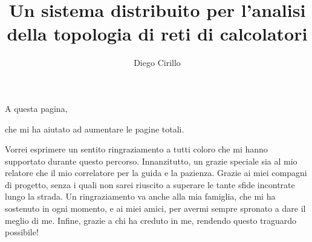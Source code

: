 \documentclass[target=bach,aauheader=,style=]{thud}
\title{Un sistema distribuito per l'analisi della topologia di reti di calcolatori}
\author{Diego Cirillo}
\begin{document}
\maketitle

\begin{dedication}
	A questa pagina, \par che mi ha aiutato ad aumentare le pagine totali.
\end{dedication}

\acknowledgements
Vorrei esprimere un sentito ringraziamento a tutti coloro che mi hanno supportato durante questo percorso. Innanzitutto, un grazie speciale sia al mio relatore che il mio correlatore per la guida e la pazienza. Grazie ai miei compagni di progetto, senza i quali non sarei riuscito a superare le tante sfide incontrate lungo la strada.
\newline
Un ringraziamento va anche alla mia famiglia, che mi ha sostenuto in ogni momento, e ai miei amici, per avermi sempre spronato a dare il meglio di me.
\newline
Infine, grazie a chi ha creduto in me, rendendo questo traguardo possibile!


\tableofcontents


\listoffigures

\mainmatter

\end{document}
